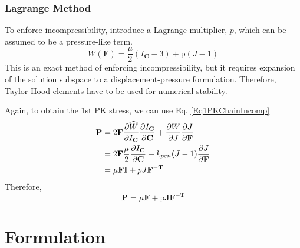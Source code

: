 \documentclass[12pt,3p]{article}
\begin{document}
\subsubsection{Lagrange Method}
\vspace{-1ex}
To enforce incompressibility, introduce a Lagrange multiplier, $p$, which can be assumed to be a pressure-like term. 
\begin{equation}\label{EqEnergyDensityLagrange}
W(\mathbf{F}) = \frac{\mu}{2} (I_\mathbf{C} - 3) + \text{p} (J-1) 
\end{equation}
This is an exact method of enforcing incompressibility, but it requires expansion of the solution subspace to a displacement-pressure formulation. Therefore, Taylor-Hood elements have to be used for numerical stability. 

Again, to obtain the 1st PK stress, we can use Eq. \ref{Eq1PKChainIncomp}
\begin{align*}
\mathbf{P}
	&=2 \mathbf{F}  \pdv{\widehat{W}}{I_\mathbf{C}} \pdv{I_\mathbf{C}}{\mathbf{C}} + \pdv{W}{J} \pdv{J}{\mathbf{F}} \\
	&= 2 \mathbf{F} \frac{\mu}{2} \pdv{I_\mathbf{C}}{\mathbf{C}} + k_{pen}(J-1) \pdv{J}{\mathbf{F}} \\
	&= \mu \mathbf{F} \mathbf{I} + p J \mathbf{F^{-T}}
\end{align*}
Therefore,
\begin{equation}\label{EqLagrange1PK}
\mathbf{P} = \mu \mathbf{F} + \text{p} \mathbf{J} \mathbf{F^{-T}}
\end{equation}

\section{Formulation}
\vspace{-2ex}

\end{document}
